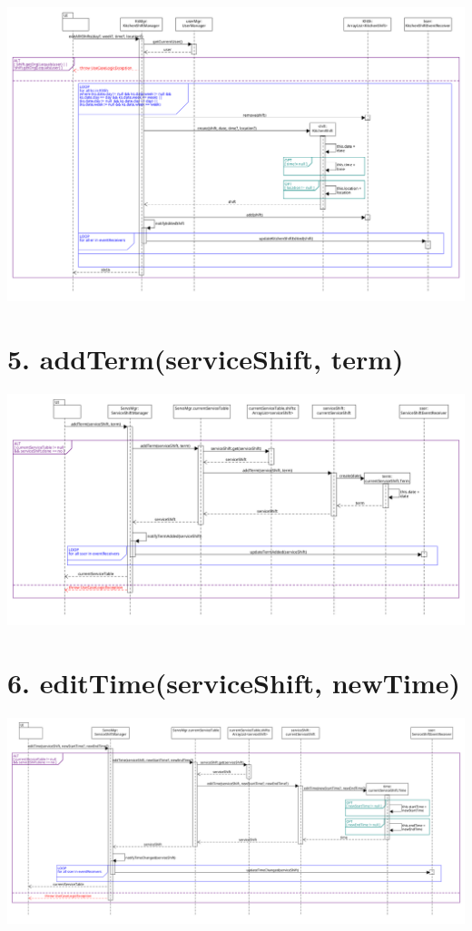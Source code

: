 \begin{center}
  \includegraphics[scale = 0.28]{images/DSD/Esame DSD 1c.png}
\end{center}
\pagebreak
\section*{5. addTerm(serviceShift, term)}

\begin{center}
  \includegraphics[scale = 0.28]{images/DSD/Esame DSD 5.png}
\end{center}
\pagebreak
\section*{6. editTime(serviceShift, newTime)}

\begin{center}
  \includegraphics[scale = 0.24]{images/DSD/Esame DSD 6.png}
\end{center}
\pagebreak

